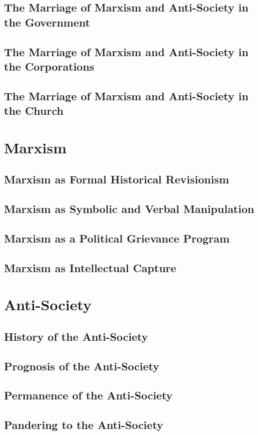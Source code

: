 \documentclass[12pt]{article}
\begin{document}
\subsection{The Marriage of Marxism and Anti-Society in the Government}
\subsection{The Marriage of Marxism and Anti-Society in the Corporations}
\subsection{The Marriage of Marxism and Anti-Society in the Church}

\section{Marxism}
\subsection{Marxism as Formal Historical Revisionism}
\subsection{Marxism as Symbolic and Verbal Manipulation}
\subsection{Marxism as a Political Grievance Program}
\subsection{Marxism as Intellectual Capture}

\section{Anti-Society}
\subsection{History of the Anti-Society}
\subsection{Prognosis of the Anti-Society}
\subsection{Permanence of the Anti-Society}
\subsection{Pandering to the Anti-Society}
\end{document}
